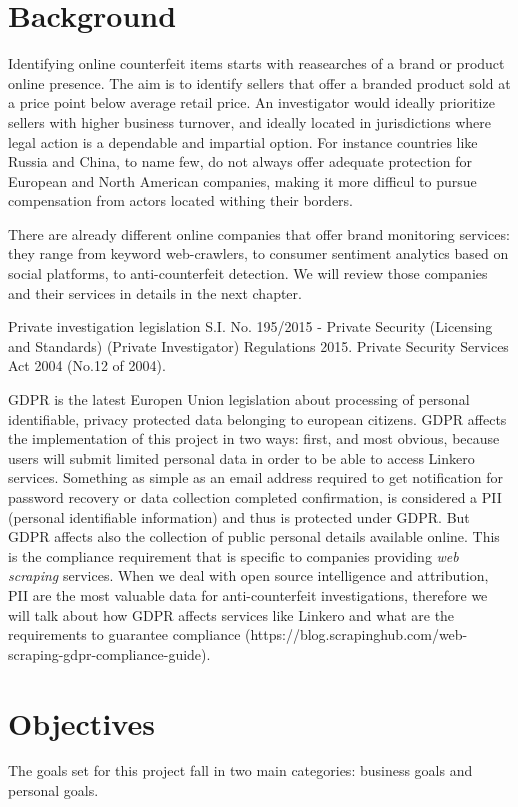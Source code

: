 \section{Background}
Identifying online counterfeit items starts with reasearches of a brand or
product online presence. The aim is to identify sellers that offer a branded
product sold at a price point below average retail price. An investigator would
ideally prioritize sellers with higher business turnover, and ideally located in
jurisdictions where legal action is a dependable and impartial option. For
instance countries like Russia and China, to name few, do not always offer
adequate protection for European and North American companies, making it more difficul to pursue
compensation from actors located withing their borders.

There are already different online companies that offer brand monitoring
services: they range from keyword web-crawlers, to consumer sentiment analytics
based on social platforms, to anti-counterfeit detection. We will review those
companies and their services in details in the next chapter.

Private investigation legislation S.I. No. 195/2015 - Private Security
(Licensing and Standards) (Private Investigator) Regulations 2015. Private
Security Services Act 2004 (No.12 of 2004).

GDPR is the latest Europen Union legislation about processing of personal
identifiable, privacy protected data belonging to european citizens. GDPR
affects the implementation of this project in two ways: first, and most obvious,
because users will submit limited personal data in order to be able to access
Linkero services. Something as simple as an email address required to get
notification for password recovery or data collection completed confirmation, is
considered a PII (personal identifiable information) and thus is protected under
GDPR. But GDPR affects also the collection of public personal details available
online. This is the compliance requirement that is specific to companies
providing \emph{web scraping} services. When we deal with open source
intelligence and attribution, PII are the most valuable data for
anti-counterfeit investigations, therefore we will talk about how GDPR affects
services like Linkero and what are the requirements to guarantee compliance
(https://blog.scrapinghub.com/web-scraping-gdpr-compliance-guide).


\section{Objectives}
The goals set for this project fall in two main categories: business goals and
personal goals.

